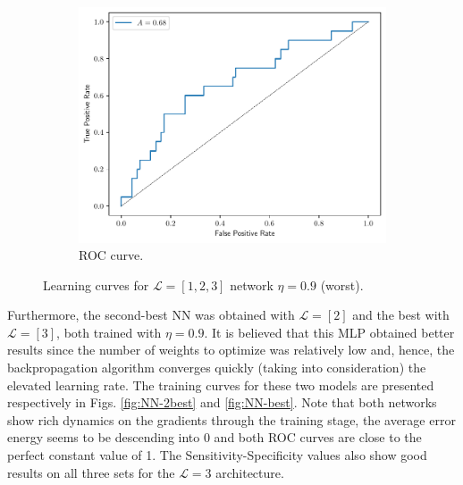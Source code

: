 \documentclass[conference]{IEEEtran}
\theoremstyle{definition}
\theoremstyle{remark}
\theoremstyle{remark}
\begin{document}
\begin{figure}
\begin{subfigure}[b]{0.32\textwidth}
    \centering \includegraphics[width=\textwidth]{figs/1-2-3-0.9-roc.pdf}
    \caption{ROC curve.}
    \label{subfig:roc-worst-NN}
  \end{subfigure}
  \caption{Learning curves for $\mathcal{L}=[1,2,3]$ network $\eta=0.9$
    (worst).}
  \label{fig:NN-worst}
\end{figure}

Furthermore, the second-best NN was obtained with $\mathcal{L}=[2]$ and the best
with $\mathcal{L}=[3]$, both trained with $\eta=0.9$. It is believed that this
MLP obtained better results since the number of weights to optimize was
relatively low and, hence, the backpropagation algorithm converges quickly
(taking into consideration) the elevated learning rate. The training curves for
these two models are presented respectively in Figs. \ref{fig:NN-2best} and
\ref{fig:NN-best}. Note that both networks show rich dynamics on the gradients
through the training stage, the average error energy seems to be descending into
0 and both ROC curves are close to the perfect constant value of 1. The
Sensitivity-Specificity values also show good results on all three sets for the
$\mathcal{L}=3$ architecture.
\end{document}
